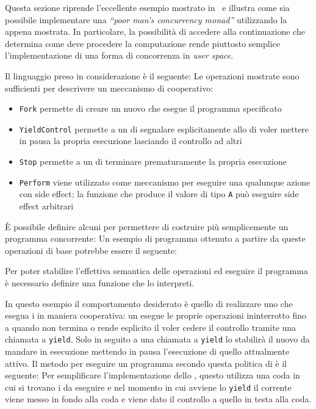 Questa sezione riprende l'eccellente esempio mostrato in~\cite{cit:a-poor-mans-concurrency-monad} e illustra come sia possibile implementare una \emph{``poor man's concurrency monad''} utilizzando la  appena mostrata.
In particolare, la possibilità di accedere alla continuazione che determina come deve procedere la computazione rende piuttosto semplice l'implementazione di una forma di concorrenza in \emph{user space}.

Il linguaggio preso in considerazione è il seguente:
Le operazioni mostrate sono sufficienti per descrivere un meccanismo di  cooperativo:
\begin{itemize}
  \item \lstinline{Fork} permette di creare un nuovo  che esegue il programma specificato
  \item \lstinline{YieldControl} permette a un  di segnalare esplicitamente allo  di voler mettere in pausa la propria esecuzione lasciando il controllo ad altri 
  \item \lstinline{Stop} permette a un  di terminare prematuramente la propria esecuzione
  \item \lstinline{Perform} viene utilizzato come meccanismo per eseguire una qualunque azione con side effect; la funzione che produce il valore di tipo \lstinline{A} può eseguire side effect arbitrari
\end{itemize}

È possibile definire alcuni  per permettere di costruire più semplicemente un programma concorrente:
Un esempio di programma ottenuto a partire da queste operazioni di base potrebbe essere il seguente:

Per poter stabilire l'effettiva semantica delle operazioni ed eseguire il programma è necessario definire una funzione che lo interpreti.

In questo esempio il comportamento desiderato è quello di realizzare uno  che esegua i  in maniera cooperativa: un  esegue le proprie operazioni ininterrotto fino a quando non termina o rende esplicito il voler cedere il controllo tramite una chiamata a \lstinline{yield}. Solo in seguito a una chiamata a \lstinline{yield} lo  stabilirà il nuovo  da mandare in esecuzione mettendo in pausa l'esecuzione di quello attualmente attivo.
Il metodo per eseguire un programma secondo questa politica di  è il seguente:
Per semplificare l'implementazione dello , questo utilizza una coda in cui si trovano i  da eseguire e nel momento in cui avviene lo \lstinline{yield} il  corrente viene messo in fondo alla coda e viene dato il controllo a quello in testa alla coda.

